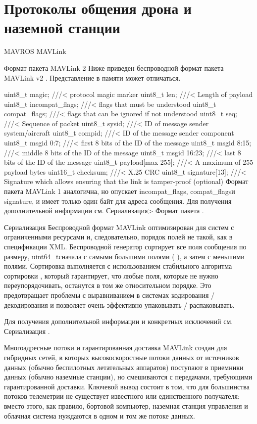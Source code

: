 
\section{Протоколы общения дрона и наземной станции}
MAVROS
MAVLink

Формат пакета MAVLink 2
Ниже приведен беспроводной формат пакета MAVLink v2 . Представление в памяти может отличаться.

uint8\_t magic;              ///< protocol magic marker
uint8\_t len;                ///< Length of payload
uint8\_t incompat\_flags;     ///< flags that must be understood
uint8\_t compat\_flags;       ///< flags that can be ignored if not understood
uint8\_t seq;                ///< Sequence of packet
uint8\_t sysid;              ///< ID of message sender system/aircraft
uint8\_t compid;             ///< ID of the message sender component
uint8\_t msgid 0:7;          ///< first 8 bits of the ID of the message
uint8\_t msgid 8:15;         ///< middle 8 bits of the ID of the message
uint8\_t msgid 16:23;        ///< last 8 bits of the ID of the message
uint8\_t payload[max 255];   ///< A maximum of 255 payload bytes
uint16\_t checksum;          ///< X.25 CRC
uint8\_t signature[13];      ///< Signature which allows ensuring that the link is tamper-proof (optional)
Формат пакета MAVLink 1 аналогична, но опускает incompat\_flags, compat\_flagsи signature, и имеет только один байт для адреса сообщения. Для получения дополнительной информации см. Сериализация> Формат пакета .

Сериализация
Беспроводной формат MAVLink оптимизирован для систем с ограниченными ресурсами и, следовательно, порядок полей не такой, как в спецификации XML. Беспроводной генератор сортирует все поля сообщения по размеру, uint64\_tсначала с самыми большими полями ( ), а затем с меньшими полями. Сортировка выполняется с использованием стабильного алгоритма сортировки , который гарантирует, что любые поля, которые не нужно переупорядочивать, останутся в том же относительном порядке. Это предотвращает проблемы с выравниванием в системах кодирования / декодирования и позволяет очень эффективно упаковывать / распаковывать.

Для получения дополнительной информации и конкретных исключений см. Сериализация .

Многоадресные потоки и гарантированная доставка
MAVLink создан для гибридных сетей, в которых высокоскоростные потоки данных от источников данных (обычно беспилотных летательных аппаратов) поступают в приемники данных (обычно наземные станции), но смешиваются с передачами, требующими гарантированной доставки. Ключевой вывод состоит в том, что для большинства потоков телеметрии не существует известного или единственного получателя: вместо этого, как правило, бортовой компьютер, наземная станция управления и облачная система нуждаются в одном и том же потоке данных.

